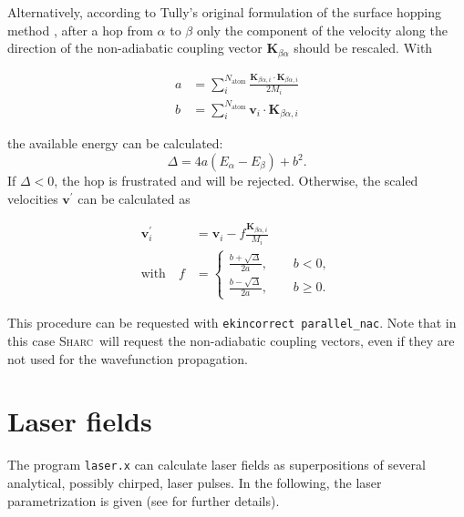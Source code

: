 \documentclass[a4paper,11pt,DIV=15,openany,twoside=false]{scrbook}
\newcommand{\tthdump}[1]{#1}
\newcommand{\sharc}{\textsc{Sharc}}
\newcommand{\ttt}[1]{\texttt{#1}}
\renewcommand{\vec}[1]{\ensuremath{\mathbf{#1}}}
\begin{document}
Alternatively, according to Tully's original formulation of the surface hopping method \cite{Tully1990JCP}, after a hop from $\alpha$ to $\beta$ only the component of the velocity along the direction of the non-adiabatic coupling vector $\vec{K}_{\beta\alpha}$ should be rescaled. With
\tthdump{
  \begin{align}
    a&=\sum\limits_i^{N_\mathrm{atom}} \frac{\vec{K}_{\beta\alpha, i}\cdot\vec{K}_{\beta\alpha, i}}{2M_i}\\
    b&=\sum\limits_i^{N_\mathrm{atom}} \vec{v}_{i}\cdot\vec{K}_{\beta\alpha, i}
  \end{align}
}
the available energy can be calculated:
\begin{equation}
  \Delta=
  4a
  \left(
    E_\alpha-E_\beta
  \right)+b^2.
\end{equation}
If $\Delta<0$, the hop is frustrated and will be rejected. Otherwise, the scaled velocities $\vec{v}^\prime$ can be calculated as
\tthdump{
  \begin{align}
    \vec{v}_i^\prime&=\vec{v}_i-f\frac{\vec{K}_{\beta\alpha, i}}{M_i}\\
    \mathrm{with}\quad f&=
    \begin{cases}
      \frac{b+\sqrt{\Delta}}{2a},\qquad b<0,\\
      \frac{b-\sqrt{\Delta}}{2a},\qquad b\geq 0.
    \end{cases}
  \end{align}
}
This procedure can be requested with \ttt{ekincorrect parallel\_nac}. Note that in this case \sharc\ will request the non-adiabatic coupling vectors, even if they are not used for the wavefunction propagation.


\section{Laser fields}\label{met:laser_field}

The program \ttt{laser.x} can calculate laser fields as superpositions of several analytical, possibly chirped, laser pulses. In the following, the laser parametrization is given (see \cite{Marquetand2007} for further details).
\end{document}
